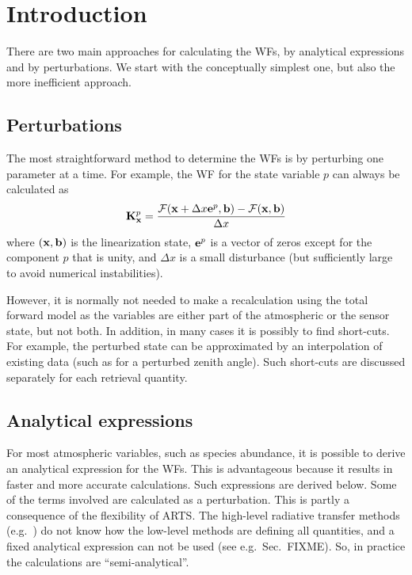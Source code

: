 \section{Introduction}
\label{sec:wfuns:intro}
%
There are two main approaches for calculating the WFs, by analytical
expressions and by perturbations. We start with the conceptually simplest one,
but also the more inefficient approach.



\subsection{Perturbations}
\label{sec:wfuns:pert}
%
The most straightforward method to determine the WFs is by perturbing
one parameter at a time. For example, the WF for the state variable
$p$ can always be calculated as 
\begin{equation}
  \mathbf{K}_{\mathbf{x}}^p = \frac{\mathcal{F}(\mathbf{x}+\Delta x\mathbf{e}^p,\mathbf{b})-
                              \mathcal{F}(\mathbf{x},\mathbf{b})}{\Delta x}
 \label{eq:wfuns:perturb}
\end{equation}
where $(\mathbf{x},\mathbf{b})$ is the linearization state, $\mathbf{e}^p$ is a
vector of zeros except for the component $p$ that is unity, and
$\Delta x$ is a small disturbance (but sufficiently large to avoid
numerical instabilities).

However, it is normally not needed to make a recalculation using the total
forward model as the variables are either part of the atmospheric or the sensor
state, but not both. In addition, in many cases it is possibly to find
short-cuts. For example, the perturbed state can be approximated by an
interpolation of existing data (such as for a perturbed zenith angle). Such
short-cuts are discussed separately for each retrieval quantity.


\subsection{Analytical expressions}
\label{sec:wfuns:anal}
%
For most atmospheric variables, such as species abundance, it is possible to
derive an analytical expression for the WFs. This is advantageous because it
results in faster and more accurate calculations. Such expressions are derived
below. Some of the terms involved are calculated as a perturbation. This is
partly a consequence of the flexibility of ARTS. The high-level radiative
transfer methods (e.g.\ ) do not know
how the low-level methods are defining all quantities, and a fixed analytical
expression can not be used (see e.g.\ Sec.~FIXME). So, in practice the
calculations are ``semi-analytical''.

